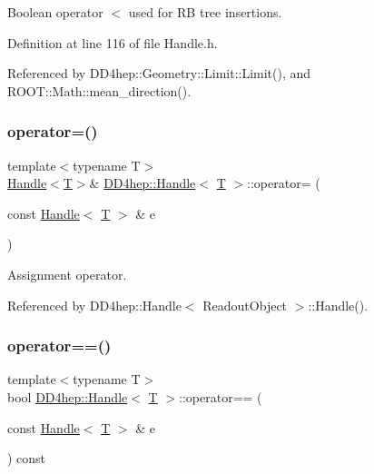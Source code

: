 Boolean operator $<$ used for RB tree insertions. 



Definition at line 116 of file Handle.\+h.



Referenced by D\+D4hep\+::\+Geometry\+::\+Limit\+::\+Limit(), and R\+O\+O\+T\+::\+Math\+::mean\+\_\+direction().

\hypertarget{class_d_d4hep_1_1_handle_a5533618199d670602acedf94b39f1aa4}{}\label{class_d_d4hep_1_1_handle_a5533618199d670602acedf94b39f1aa4} 
\subsubsection{\texorpdfstring{operator=()}{operator=()}}
{\footnotesize\ttfamily template$<$typename T$>$ \\
\hyperlink{class_d_d4hep_1_1_handle}{Handle}$<$\hyperlink{class_t}{T}$>$\& \hyperlink{class_d_d4hep_1_1_handle}{D\+D4hep\+::\+Handle}$<$ \hyperlink{class_t}{T} $>$\+::operator= (\begin{DoxyParamCaption}\item[{const \hyperlink{class_d_d4hep_1_1_handle}{Handle}$<$ \hyperlink{class_t}{T} $>$ \&}]{e }\end{DoxyParamCaption})\hspace{0.3cm}{\ttfamily [default]}}



Assignment operator. 



Referenced by D\+D4hep\+::\+Handle$<$ Readout\+Object $>$\+::\+Handle().

\hypertarget{class_d_d4hep_1_1_handle_a4db0f6aa089778ce971c00912bcc3864}{}\label{class_d_d4hep_1_1_handle_a4db0f6aa089778ce971c00912bcc3864} 
\subsubsection{\texorpdfstring{operator==()}{operator==()}}
{\footnotesize\ttfamily template$<$typename T$>$ \\
bool \hyperlink{class_d_d4hep_1_1_handle}{D\+D4hep\+::\+Handle}$<$ \hyperlink{class_t}{T} $>$\+::operator== (\begin{DoxyParamCaption}\item[{const \hyperlink{class_d_d4hep_1_1_handle}{Handle}$<$ \hyperlink{class_t}{T} $>$ \&}]{e }\end{DoxyParamCaption}) const\hspace{0.3cm}{\ttfamily [inline]}}



